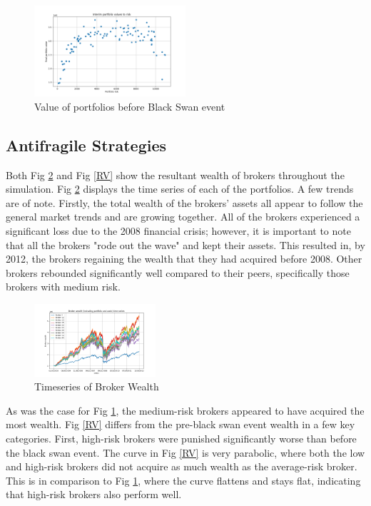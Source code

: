 \documentclass[letterpaper, 11 pt, proceedings]{IEEEtran}
\begin{document}
	\begin{figure}[h]
		\centering
		\includegraphics[width=0.5\textwidth]{interimRiskToValue.png}
		\caption{Value of portfolios before Black Swan event}
		\label{interimRV}
	\end{figure}
	\FloatBarrier

	\subsection{Antifragile Strategies}\label{subsec:results_end}	
	
	Both Fig \ref{ts_03-12} and Fig \ref{RV} show the resultant wealth of brokers throughout the simulation. Fig \ref{ts_03-12} displays the time series of each of the portfolios. A few trends are of note. Firstly, the total wealth of the brokers' assets all appear to follow the general market trends and are growing together. All of the brokers experienced a significant loss due to the 2008 financial crisis; however, it is important to note that all the brokers "rode out the wave" and kept their assets. This resulted in, by 2012, the brokers regaining the wealth that they had acquired before 2008. Other brokers rebounded significantly well compared to their peers, specifically those brokers with medium risk.

	\begin{figure}[h]
		\centering
		\includegraphics[width=0.4\textwidth]{timeSeriesJoint.png}
		\caption{Timeseries of Broker Wealth}
		\label{ts_03-12}
	\end{figure}
	\FloatBarrier

	As was the case for Fig \ref{interimRV}, the medium-risk brokers appeared to have acquired the most wealth. Fig \ref{RV} differs from the pre-black swan event wealth in a few key categories. First, high-risk brokers were punished significantly worse than before the black swan event. The curve in Fig \ref{RV} is very parabolic, where both the low and high-risk brokers did not acquire as much wealth as the average-risk broker. This is in comparison to Fig \ref{interimRV}, where the curve flattens and stays flat, indicating that high-risk brokers also perform well.
\end{document}
